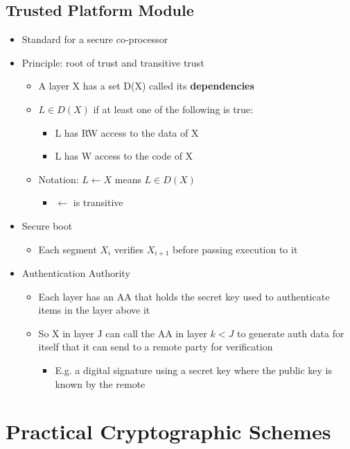 \documentclass[11pt]{report}
\begin{document}
\section{Trusted Platform Module}
\begin{itemize}
	\item Standard for a secure co-processor
	\item Principle: root of trust and transitive trust
	\begin{itemize}
		\item A layer X has a set D(X) called its \textbf{dependencies}
		\item $L \in D(X)$ if at least one of the following is true:
		\begin{itemize}
			\item L has RW access to the data of X
			\item L has W access to the code of X
		\end{itemize}
		\item Notation: $L \xleftarrow{} X$ means $L \in D(X)$
		\begin{itemize}
			\item $\xleftarrow{}$ is transitive
		\end{itemize}
	\end{itemize}
	\item Secure boot
	\begin{itemize}
		\item Each segment $X_i$ verifies $X_{i+1}$ before passing execution to it
	\end{itemize}
	\item Authentication Authority
	\begin{itemize}
		\item Each layer has an AA that holds the secret key used to authenticate items in the layer above it
		\item So X in layer J can call the AA in layer $k < J$ to generate auth data for itself that it can send to a remote party for verification
		\begin{itemize}
			\item E.g. a digital signature using a secret key where the public key is known by the remote
		\end{itemize}
	\end{itemize}
\end{itemize}

\chapter{Practical Cryptographic Schemes}\label{sec:topic-2}
\end{document}
